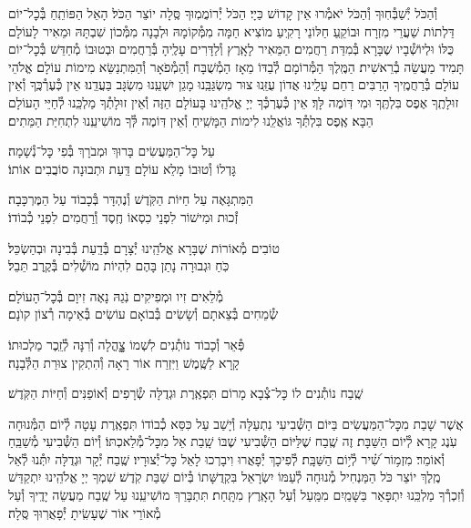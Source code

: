 \documentclass[twoside, openany, parskip=half, 11pt]{book}
\begin{document}
וְ֯הַכֹּל יְ֯שַׁבְּ֯חֽוּךָ וְ֯הַכֹּל יֹאמְ֯רוּ אֵין קָדוֹשׁ כַּיָי׃ הַכֹּל יְ֯רוֹמֲמֽוּךָ סֶּֽלָה יוֹצֵר הַכֹּל׃ הָאֵל הַפּוֹתֵֽחַ בְּ֯כׇל־יוֹם דַּלְתוֹת שַׁעֲרֵי מִזְרָח
וּבוֹקֵֽעַ חַלּוֹנֵי רָקִֽיעַ מוֹצִיא חַמָּה מִמְּ֯קוֹמָהּ וּלְבָנָה מִמְּ֯כוֹן שִׁבְתָּהּ
וּמֵאִיר לָעוֹלָם כֻּלּוֹ וּלְיוֹשְׁ֯בָיו שֶׁבָּרָא בְּ֯מִדַּת רַחֲמִים׃ הַמֵּאִיר לָאָֽרֶץ וְ֯לַדָּרִים עָלֶֽיהָ בְּ֯רַחֲמִים וּבְטוּבוֹ מְ֯חַדֵּשׁ בְּ֯כׇל־יוֹם תָּמִיד מַעֲשֵׂה בְ֯רֵאשִׁית׃
הַמֶּֽלֶךְ הַמְּ֯רוֹמָם לְ֯בַדּוֹ מֵאָז הַמְ֯שֻׁבָּח וְ֯הַמְ֯פֹאָר וְ֯הַמִּתְנַשֵּׂא מִימוֹת עוֹלָם׃ אֱלֹהֵי עוֹלָם בְּ֯רַחֲמֶֽיךָ הָרַבִּים רַחֵם עָלֵֽינוּ אֲדוֹן עֻזֵּֽנוּ צוּר מִשְׂגַּבֵּֽנוּ מָגֵן יִשְׁעֵֽנוּ מִשְׂגָּב בַּעֲדֵֽנוּ׃
אֵין כְּ֯עֶרְ֯כֶּֽךָ וְ֯אֵין זוּלָתֶֽךָ אֶפֶס בִּלְתֶּֽךָ וּמִי דּֽוֹמֶה לָּךְ׃
אֵין כְּ֯עֶרְכְּ֯ךָ יְיָ אֱלֹהֵֽינוּ בָּעוֹלָם הַזֶּה וְ֯אֵין זוּלָתְ֯ךָ מַלְכֵּֽנוּ לְ֯חַיֵּי הָעוֹלָם הַבָּא׃
אֶֽפֶס בִּלְתְּ֯ךָ גּוֹאֲלֵֽנוּ לִימוֹת הַמָּשִֽׁיחַ וְ֯אֵין דּֽוֹמֶה לְּ֯ךָ מוֹשִׁיעֵֽנוּ לִתְחִיַּת הַמֵּתִים׃

עַל כׇּל־הַמַּעֲשִׂים \hfill בָּרוּךְ וּמְבֹרָךְ בְּ֯פִי כׇּל־נְ֯שָׁמָה׃ \\
גׇּדְלוֹ וְ֯טוּבוֹ מָלֵא עוֹלָם \hfill דַּֽעַת וּתְבוּנָה סוֹבֲבִים אוֹתוֹ׃

הַמִּתְגָּאֶה עַל חַיּוֹת הַקֹּֽדֶשׁ \hfill וְ֯נֶהְדָּר בְּ֯כָבוֹד עַל הַמֶּרְכָּבָה׃\\
זְ֯כוּת וּמִישׁוֹר לִפְנֵי כִסְאוֹ \hfill חֶֽסֶד וְ֯רַחֲמִים לִפְנֵי כְ֯בוֹדוֹ׃

טוֹבִים מְ֯אוֹרוֹת שֶׁבָּרָא אֱלֹהֵֽינוּ \hfill יְ֯צָרָם בְּ֯דַֽעַת בְּ֯בִינָה וּבְהַשְׂכֵּל׃\\
כֹּֽחַ וּגְבוּרָה נָתַן בָּהֶם \hfill לִהְיוֹת מוֹשְׁ֯לִים בְּ֯קֶֽרֶב תֵּבֵל׃

מְ֯לֵאִים זִיו וּמְפִיקִים נֹֽגַהּ \hfill נָאֶה זִיוָם בְּ֯כׇל־הָעוֹלָם׃ \\
שְׂ֯מֵחִים בְּ֯צֵאתָם וְ֯שָׂשִׂים בְּ֯בוֹאָם \hfill עוֹשִׂים בְּ֯אֵימָה רְ֯צוֹן קוׂנָם׃

פְּ֯אֵר וְ֯כָבוֹד נוֹתְ֯נִים לִשְׁמוֹ \hfill צׇׇׇׇהֳלָה וְ֯רִנָּה לְ֯זֵֽכֶר מַלְכוּתוֹ׃ \\
קָרָא לַשֶּֽׁמֶשׁ וַיִּזְרַח אוֹר \hfill רָאָה וְ֯הִתְקִין צוּרַת הַלְּ֯בָנָה׃

שֶֽׁבַח נוֹתְ֯נִים לוֹ כׇּל־צְ֯בָא מָרוֹם \hfill תִּפְאֶֽרֶת וּגְדֻלָּה שְׂ֯רָפִים וְ֯אוֹפַנִּים וְ֯חַיּוֹת הַקֹּֽדֶשׁ׃

אֲשֶׁר שָׁבַת מִכׇּל־הַמַּעֲשִׂים בַּיּוֹם הַשְּׁ֯בִיעִי נִתְעַלָּה וְ֯יָשַׁב עַל כִּסֵּא כְ֯בוֹדוֹ תִּפְאֶֽרֶת עָטָה לְ֯יוֹם הַמְּ֯נוּחָה עֹֽנֶג קָרָא לְ֯יוֹם הַשַּׁבָּת׃ זֶה שֶֽׁבַח שֶׁלַּיּוֹם הַשְּׁ֯בִיעִי שֶׁבּוֹ שָֽׁבַת אֵל מִכׇּל־מְ֯לַאכְתּוֹ׃ וְ֯יוֹם הַשְּׁ֯בִיעִי מְ֯שַׁבֵּֽחַ וְ֯אוֹמֵר׃
%
מִזְמ֥וֹר שִׁ֝֗יר לְ֯י֥וֹם הַשַּׁבָּֽת׃ לְ֯פִיכָךְ יְ֯פָאֲרוּ וִיבָרְכוּ לָאֵל כׇּל־יְ֯צוּרָיו׃ שֶֽׁבַח יְ֯קָר וּגְדֻלָּה יִתְּ֯נוּ לְ֯אֵל מֶֽלֶךְ יוֹצֵר כֹּל הַמַּנְחִיל מְ֯נוּחָה לְ֯עַמּוֹ יִשְׂרָאֵל בִּקְדֻשָּׁתוֹ בְּ֯יוֹם שַׁבַּת קֹֽדֶשׁ׃ שִׁמְךָ יְיָ אֱלֹהֵֽינוּ יִתְקַדַּשׁ וְ֯זִכְרְ֯ךָ מַלְכֵּֽנוּ יִתְפָּאַר בַּשָּׁמַֽיִם מִמַּֽעַל וְ֯עַל הָאָֽרֶץ מִתָּֽחַת׃ תִּתְבָּרַךְ מוֹשִׁיעֵֽנוּ עַל שֶֽׁבַח מַעֲשֵׂה יָדֶֽיךָ וְ֯עַל מְ֯אוֹרֵי אוֹר שֶׁעָשִֽׂיתָ יְ֯פָאֲרֽוּךָ סֶּֽלָה׃
\end{document}
